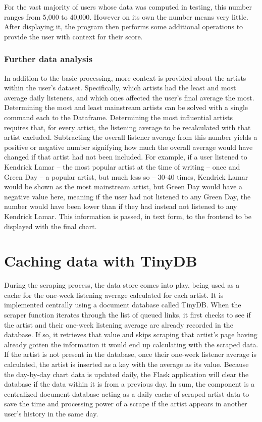 For the vast majority of users whose data was computed in testing, this number ranges from 5,000 to 40,000. However on its own the number means very little. After displaying it, the program then performs some additional operations to provide the user with context for their score.

\subsubsection{Further data analysis}

In addition to the basic processing, more context is provided about the artists within the user's dataset. Specifically, which artists had the least and most average daily listeners, and which ones affected the user's final average the most. Determining the most and least mainstream artists can be solved with a single command each to the Dataframe. Determining the most influential artists requires that, for every artist, the listening average to be recalculated with that artist excluded. Subtracting the overall listener average from this number yields a positive or negative number signifying how much the overall average would have changed if that artist had not been included. For example, if a user listened to Kendrick Lamar -- the most popular artist at the time of writing -- once and Green Day -- a popular artist, but much less so -- 30-40 times, Kendrick Lamar would be shown as the most mainstream artist, but Green Day would have a negative value here, meaning if the user had not listened to any Green Day, the number would have been lower than if they had instead not listened to any Kendrick Lamar. This information is passed, in text form, to the frontend to be displayed with the final chart.

\section{Caching data with TinyDB}

During the scraping process, the data store comes into play, being used as a cache for the one-week listening average calculated for each artist. It is implemented centrally using a document database called TinyDB. When the scraper function iterates through the list of queued links, it first checks to see if the artist and their one-week listening average are already recorded in the database. If so, it retrieves that value and skips scraping that artist's page having already gotten the information it would end up calculating with the scraped data. If the artist is not present in the database, once their one-week listener average is calculated, the artist is inserted as a key with the average as its value. Because the day-by-day chart data is updated daily, the Flask application will clear the database if the data within it is from a previous day. In sum, the component is a centralized document database acting as a daily cache of scraped artist data to save the time and processing power of a scrape if the artist appears in another user's history in the same day.

